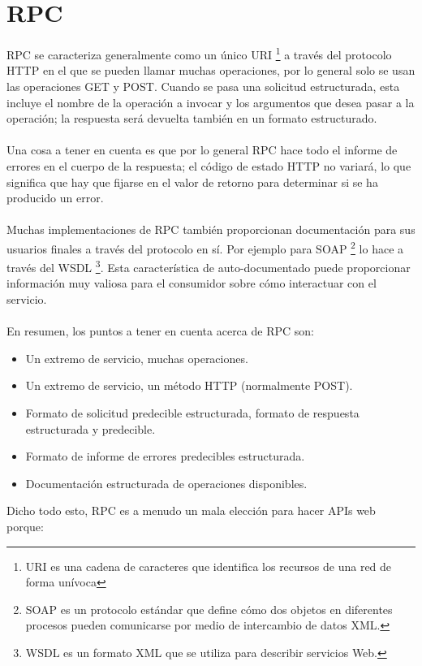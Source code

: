 \section{RPC}
RPC se caracteriza generalmente como un único URI \footnote{URI es una cadena de caracteres que identifica los recursos de una red de forma unívoca} a través del protocolo HTTP en el que se pueden llamar muchas operaciones, por lo general solo se usan las operaciones GET y POST. Cuando se pasa una solicitud estructurada, esta incluye el nombre de la operación a invocar y los argumentos que desea pasar a la operación; la respuesta será devuelta también en un formato estructurado.\\
\\
Una cosa a tener en cuenta es que por lo general RPC hace todo el informe de errores en el cuerpo de la respuesta; el código de estado HTTP no variará, lo que significa que hay que fijarse en el valor de retorno para determinar si se ha producido un error.\\
\\
Muchas implementaciones de RPC también proporcionan documentación para sus usuarios finales a través del protocolo en sí. Por ejemplo para SOAP \footnote{SOAP es un protocolo estándar que define cómo dos objetos en diferentes procesos pueden comunicarse por medio de intercambio de datos XML.} lo hace a través del WSDL \footnote{WSDL es un formato XML que se utiliza para describir servicios Web.}. Esta característica de auto-documentado puede proporcionar información muy valiosa para el consumidor sobre cómo interactuar con el servicio.\\
\\
En resumen, los puntos a tener en cuenta acerca de RPC son:

\begin{itemize}
\item Un extremo de servicio, muchas operaciones.
\item Un extremo de servicio, un método HTTP (normalmente POST).
\item Formato de solicitud predecible estructurada, formato de respuesta estructurada y predecible.
\item Formato de informe de errores predecibles estructurada.
\item Documentación estructurada de operaciones disponibles.
\end{itemize}

\vspace{5mm}

Dicho todo esto, RPC es a menudo un mala elección para hacer APIs web porque:

